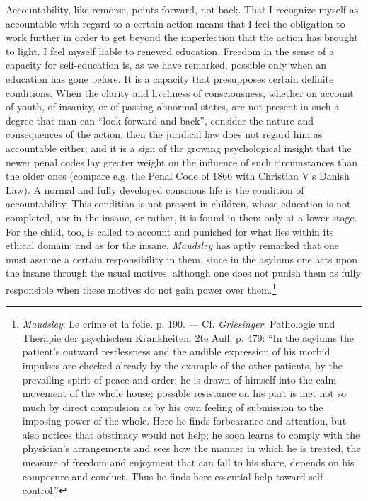 \documentclass[12pt,a4paper,openany]{book}
\newcommand{\opage}[1]{\marginnote{\footnotesize\textit{[#1]}}}
\begin{document}
Accountability, like remorse, points forward, not back. That I recognize
myself as accountable with regard to a certain action means that I feel the
obligation to work further in order to get beyond the imperfection that the
action has brought to light. I feel myself liable to renewed education.
Freedom in the sense of a capacity for self-education is, as we have remarked,
possible only when an education has gone before. It is a capacity that
presupposes certain definite conditions. When the clarity and liveliness of
consciousness, whether on account of youth, of insanity, or of passing
abnormal states, are not present in such a degree that man can ``look forward
and back'', consider the nature and consequences of the action, then the
juridical law does not regard him as accountable either; and it is a sign of
the growing psychological insight that the newer penal codes lay greater
weight on the influence of such circumstances than the older ones (compare
e.g. the Penal Code of 1866 with Christian V's Danish Law). A normal and fully
developed conscious life is the condition of accountability. This condition is
not present in children, whose education is not completed, nor in the insane,
or rather, it is found in them only at a lower stage. For the child, too, is
called to account and punished for what lies within its ethical domain; and as
for the insane, \emph{Maudsley} has aptly
\opage{127}remarked that one must assume a certain responsibility in them,
since in the asylums one acts upon the insane through the usual motives,
although one does not punish them as fully responsible when these motives do
not gain power over them.\footnote[1]{\emph{Maudsley}: Le crime et la folie.
p. 190. --- Cf. \emph{Griesinger}: Pathologie und Therapie der psychischen
Krankheiten. 2te Aufl. p. 479: ``In the asylums the patient's outward
restlessness and the audible expression of his morbid impulses are checked
already by the example of the other patients, by the prevailing spirit of
peace and order; he is drawn of himself into the calm movement of the whole
house; possible resistance on his part is met not so much by direct
compulsion as by his own feeling of submission to the imposing power of the
whole. Here he finds forbearance and attention, but also notices that
obstinacy would not help; he soon learns to comply with the physician's
arrangements and sees how the manner in which he is treated, the measure of
freedom and enjoyment that can fall to his share, depends on his composure
and conduct. Thus he finds here essential help toward self-control.''}
\end{document}
